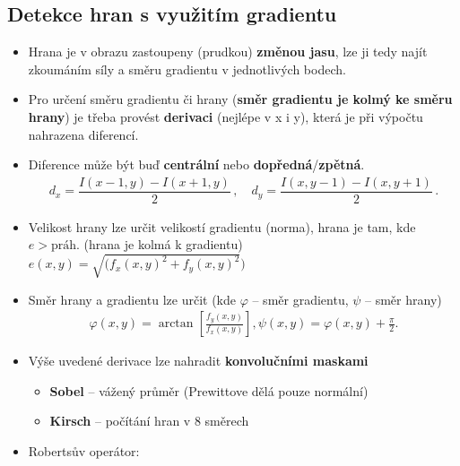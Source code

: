 \subsection{Detekce hran s využitím gradientu}
\begin{itemize}
    \item Hrana je v obrazu zastoupeny (prudkou) \textbf{změnou jasu}, lze ji tedy najít zkoumáním síly a směru gradientu v jednotlivých bodech.
    \item Pro určení směru gradientu či hrany (​\textbf{směr gradientu je kolmý ke směru hrany​}) je třeba provést ​ \textbf{derivaci​} (nejlépe v x i y), která je při výpočtu nahrazena diferencí.
    \item Diference může být buď \textbf{centrální} nebo \textbf{dopředná}/\textbf{zpětná}.
          \begin{equation*}
              \begin{split}
                  d_x = \dfrac{I(x - 1, y) - I(x + 1, y)}{2} \, , \quad     d_y= \dfrac{I(x, y - 1) - I(x, y + 1)}{2} \, .
              \end{split}
          \end{equation*}
    \item Velikost hrany lze určit velikostí gradientu (norma), hrana je tam, kde $e > \textrm{práh}$. (hrana je kolmá k gradientu) \\
          $ e(x, y) = \sqrt{(f_x(x,y)^2+ f_y(x,y)^2})$
    \item Směr hrany a gradientu lze určit (kde $\varphi$ -- směr gradientu, $\psi$ -- směr hrany)
          \begin{equation*}
              \begin{array}{c}
                  \varphi(x, y) = \arctan{[\frac{f_y(x,y)}{f_x(x,y)}]}, \psi(x,y) = \varphi(x,y) + \frac{\pi}{2}.
              \end{array}
          \end{equation*}
    \item Výše uvedené derivace lze nahradit \textbf{konvolučními maskami}
          \begin{itemize}
              \item \textbf{Sobel} -- vážený průměr (Prewittove dělá pouze normální)
              \item \textbf{Kirsch} -- počítání hran v 8 směrech
          \end{itemize}
    \item Robertsův operátor:
          \begin{equation*}

\end{equation*}
\end{itemize}
